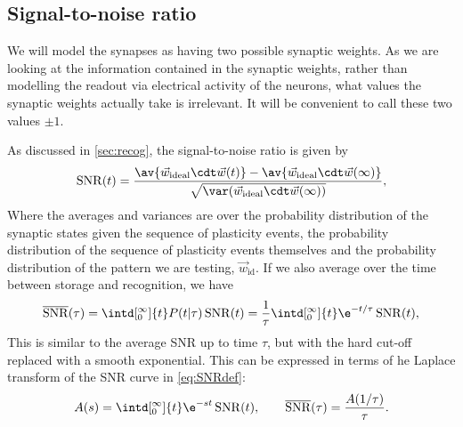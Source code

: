 \documentclass[12pt]{article}
\newcommand{\syn}{\vec{w}}
\newcommand{\synid}{\syn_\text{id}}
\DeclareMathOperator{\snr}{SNR}
\newcommand{\snrb}{\overline{\snr}}
\begin{document}
\subsection{Signal-to-noise ratio}\label{sec:snr}

We will model the synapses as having two possible synaptic weights.
As we are looking at the information contained in the synaptic weights, rather than modelling the readout via electrical activity of the neurons, what values the synaptic weights actually take is irrelevant.
It will be convenient to call these two values $\pm1$.


As discussed in \autoref{sec:recog}, the signal-to-noise ratio is given by
%
\begin{equation}\label{eq:SNRdef}
  \snr(t) = \frac{\av{\syn_\text{ideal}\cdt\syn(t)} - \av{\syn_\text{ideal}\cdt\syn(\infty)}}
     {\sqrt{\var(\syn_\text{ideal}\cdt\syn(\infty))}},
\end{equation}
%
Where the averages and variances are over the probability distribution of the synaptic states given the sequence of plasticity events, the probability distribution of the sequence of plasticity events themselves and the probability distribution of the pattern we are testing, $\synid$.
If we also average over the time between storage and recognition, we have
%
\begin{equation}\label{eq:snrb}
  \snrb(\tau) = \intd[_0^\infty]{t} P(t\vert\tau) \snr(t)
   = \frac{1}{\tau} \intd[_0^\infty]{t} \e^{-t/\tau} \snr(t),
\end{equation}
%
This is similar to the average SNR up to time $\tau$, but with the hard cut-off replaced with a smooth exponential.
This can be expressed in terms of he Laplace transform of the SNR curve in \eqref{eq:SNRdef}:
%
\begin{equation}\label{eq:laplacedef}
  A(s) = \intd[_0^\infty]{t} \e^{-st} \snr(t),
  \qquad
  \snrb(\tau) = \frac{A(1/\tau)}{\tau}.
\end{equation}
%
\end{document}
